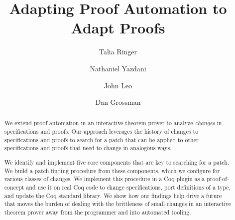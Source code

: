 \documentclass[sigplan,screen,10pt]{acmart}%
\begin{document}
\newcommand{\nate}[1]{\textbf{\textcolor{orange}{Nate: #1}}}
\newcommand{\talia}[1]{\textbf{\textcolor{blue}{Talia: #1}}}
\newcommand{\john}[1]{\textbf{\textcolor{green}{John: #1}}}

\newcommand{\sysnamelong}{\textsc{Pumpkin Patch}\xspace}
\newcommand{\sysname}{\textsc{Pumpkin}\xspace}

\newcommand{\ltacforall}{$\color{blue}\forall$\hspace{0.05cm}}
\newcommand{\ltacexists}{$\color{blue}\exists$\hspace{0.05cm}}
\newcommand{\ltacba}{\textcolor{magenta}{-}\hspace{-0.03cm}}
\newcommand{\ltacbb}{\textcolor{magenta}{+}\hspace{-0.03cm}}
\newcommand{\ltacbc}{\textcolor{magenta}{*}\hspace{-0.03cm}}
\newcommand{\remove}[1]{\textcolor{lightgray}{#1}}
\newcommand{\fails}[1]{#1\textcolor{red}{\textbf{\sffamily X}}}
\newcommand{\succeeds}[1]{#1\textcolor{teal}{\textbf{\checkmark}}}
\newcommand{\reducedstrut}{\vrule width 0pt height .9\ht\strutbox depth .9\dp\strutbox\relax}
\newcommand{\diff}[1]{%
  \begingroup
  \setlength{\fboxsep}{0pt}%
  \colorbox{orange!35}{\reducedstrut#1\/}%
  \endgroup
}
\newcommand{\inv}{^{\raisebox{0.2ex}{$\scriptscriptstyle-1$}}}
\newcommand{\IFRETURN}[2]{\STATE \algorithmicif\ {#1}\ \algorithmicthen\ \textbf{return} {#2} }
\newcommand{\RETURNIFELSE}[3]{\IF {#1} \THEN \STATE \textbf{return} {#2} \ELSE \STATE \textbf{return} {#3}}


\title{Adapting Proof Automation to Adapt Proofs}

\author{Talia Ringer}

\author{Nathaniel Yazdani}

\author{John Leo}

\author{Dan Grossman}

\begin{abstract} 
We extend proof automation in an interactive theorem prover
to analyze \emph{changes} in specifications and proofs.
Our approach leverages the history
of changes to specifications and proofs to search for a patch
that can be applied to other specifications and proofs that need
to change in analogous ways.

We identify and implement five core components that are key to
searching for a patch. We build a patch finding procedure
from these components, which we configure for various classes of changes.
We implement this procedure in a Coq plugin as a proof-of-concept and 
use it on real Coq code to 
change specifications, port definitions of a type, and update the 
Coq standard library. We show how our findings
help drive a future that moves the burden of dealing with the brittleness of small changes 
in an interactive theorem prover away from the programmer and into automated tooling.
\end{abstract}
\end{document}
